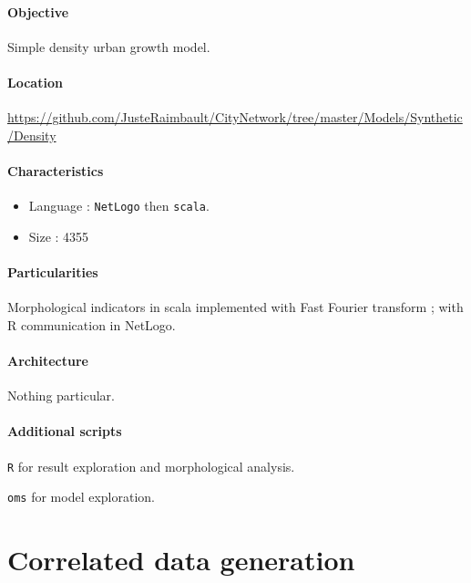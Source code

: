 \paragraph{Objective}

Simple density urban growth model.

\paragraph{Location}

\url{https://github.com/JusteRaimbault/CityNetwork/tree/master/Models/Synthetic/Density}

\paragraph{Characteristics}

\begin{itemize}
\item Language : \texttt{NetLogo} then \texttt{scala}.
\item Size : 4355
\end{itemize}


\paragraph{Particularities}

Morphological indicators in scala implemented with Fast Fourier transform ; with R communication in NetLogo.

\paragraph{Architecture}

Nothing particular.

\paragraph{Additional scripts}

\texttt{R} for result exploration and morphological analysis.

\texttt{oms} for model exploration.





\section{Correlated data generation}

